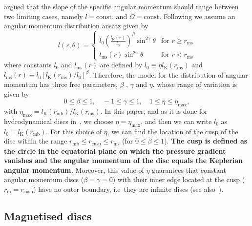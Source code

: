 \documentclass[]{aa}
\begin{document}
\cite{Jaroszynski:1980} argued that the slope of the specific angular momentum should range between two limiting cases, namely $l = \mathrm{const.}$ and $\Omega = \mathrm{const}$. Following \citet{Qian:2009} we assume an angular momentum distribution ansatz given by  
\begin{equation}
l (r,\theta) = \left\{ \label{eq:ansatz} 
  \begin{array}{lr}
    l_0 \left(\frac{l_{\mathrm{K}}(r)}{l_0}\right)^{\beta}\sin^{2\gamma}{\theta} &  \text{for } r \geq r_{\mathrm{ms}}\\
    l_{\mathrm{ms}}(r)\sin^{2\gamma}{\theta} & \text{for } r < r_{\mathrm{ms}}
  \end{array}
\right.
\end{equation}
where constants $l_0$ and $l_{\mathrm{ms}}(r)$ are defined by $l_0 \equiv \eta l_{\mathrm{K}}(r_{\mathrm{ms}})$ and $l_{\mathrm{ms}}(r) \equiv l_0 [l_{\mathrm{K}}(r_{\mathrm{ms}})/l_0]^{\beta}$. Therefore, the model for the distribution of angular momentum has three free parameters, $\beta$ , $\gamma$ and $\eta$, whose range of variation is given by~\citep{Qian:2009}
\begin{equation}
0 \leq \beta \leq 1, \quad -1 \leq \gamma \leq 1, \quad 1 \leq \eta \leq \eta_{\mathrm{max}},
\end{equation}
with $\eta_{\mathrm{max}} = l_{\mathrm{K}}(r_{\mathrm{mb}})/l_{\mathrm{K}}(r_{\mathrm{ms}})$. In this paper, and as it is done for hydrodynamical discs in~\citet{Qian:2009}, we choose $\eta = \eta_{\mathrm{max}}$, and then we can write $l_0$ as $l_0 = l_{\mathrm{K}}(r_{\mathrm{mb}})$. For this choice of $\eta$, we can find the location of the cusp of the disc  within the range $r_{\mathrm{mb}} \leq r_{\mathrm{cusp}} \leq r_{\mathrm{ms}}$ (for $0 \leq \beta \leq 1$). {\bf The cusp is defined as the circle in the equatorial plane on which the pressure gradient vanishes and the angular momentum of the disc equals the Keplerian angular momentum.} Moreover, this value of $\eta$ guarantees that constant angular momentum discs ($\beta = \gamma = 0$) with their inner edge located at the cusp ($r_{\mathrm{in}} = r_{\mathrm{cusp}}$) have no outer boundary, i.e~they are infinite discs (see also~\cite{Font:2002}). 

\subsection{Magnetised discs}
\end{document}
